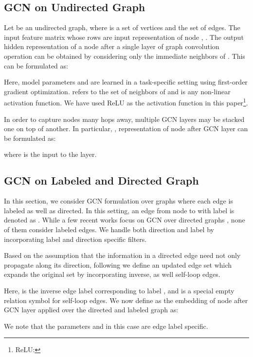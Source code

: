\documentclass[11pt,a4paper]{article}
\begin{document}
\subsection{GCN on Undirected Graph}
\label{sec:undirected_gcn}

Let  be an undirected graph, where  is a set of  vertices and  the set of edges. The input feature matrix   whose rows are input representation of node , . The output hidden representation  of a node  after a single layer of graph convolution operation can be obtained by considering only the immediate neighbors of  . This can be formulated as:

Here, model parameters  and  are learned in a task-specific setting using first-order gradient optimization.  refers to the set of neighbors of  and  is any non-linear activation function. We have used ReLU as the activation function in this paper\footnote{ReLU: }.  

In order to capture nodes many hops away, multiple GCN layers may be stacked one on top of another. In particular, , representation of node   after  GCN layer can be formulated as:

where  is the input to the  layer.

\subsection{GCN on Labeled and Directed Graph}
\label{sec:directed_gcn}

In this section, we consider GCN formulation over graphs where each edge is labeled as well as directed. In this setting, an edge from node  to  with label  is denoted as . While a few recent works focus on GCN over directed graphs \cite{gcn_summ,gcn_srl}, none of them consider labeled edges. We handle both direction and label by incorporating label and direction specific filters.

Based on the assumption that the information in a directed edge need not only propagate along its direction, following \cite{gcn_srl} we define an updated edge set  which expands the original set  by incorporating inverse, as well self-loop edges.


Here,  is the inverse edge label corresponding to label , and  is a special empty relation symbol for self-loop edges. We now define  as the embedding of node  after  GCN layer applied over the directed and labeled graph as:


We note that the parameters  and  in this case are edge label specific.
\end{document}
